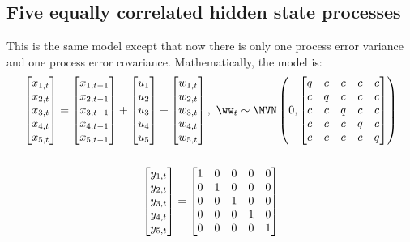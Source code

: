 \subsection{Five equally correlated hidden state processes}
This is the same model except that now there is only one process error variance and one process error covariance.  Mathematically, the model is:
\begin{gather*}
\begin{bmatrix}x_{1,t}\\x_{2,t}\\x_{3,t}\\x_{4,t}\\x_{5,t}\end{bmatrix}
= \begin{bmatrix}x_{1,t-1}\\x_{2,t-1}\\x_{3,t-1}\\x_{4,t-1}\\x_{5,t-1}\end{bmatrix}
+ \begin{bmatrix}u_1\\u_2\\u_3\\u_4\\u_5\end{bmatrix}
+ \begin{bmatrix}w_{1,t}\\w_{2,t}\\w_{3,t}\\w_{4,t}\\w_{5,t}\end{bmatrix},
 \textrm{ } \ww_t \sim \MVN\begin{pmatrix} 0,
 \begin{bmatrix}q&c&c&c&c\\c&q&c&c&c\\c&c&q&c&c\\c&c&c&q&c\\c&c&c&c&q\end{bmatrix} \end{pmatrix} \\
\\
\begin{bmatrix}y_{1,t}\\y_{2,t}\\y_{3,t}\\y_{4,t}\\y_{5,t}\end{bmatrix}
= \begin{bmatrix}1&0&0&0&0\\0&1&0&0&0\\0&0&1&0&0\\0&0&0&1&0\\0&0&0&0&1\end{bmatrix}

\end{gather*}
